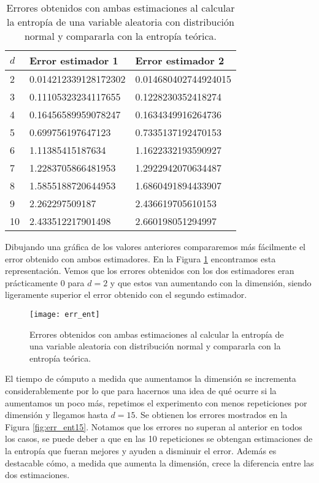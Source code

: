 \documentclass[10pt,a4paper]{article} %
\theoremstyle{definition}
\begin{document}
\begin{table}[H]
\centering
\caption{Errores obtenidos con ambas estimaciones al calcular la entropía de una variable aleatoria con distribución normal y compararla con la entropía teórica.}
\label{tab:err_ent}
\begin{tabular}{lll}
\toprule
$d$ & Error estimador 1 & Error estimador 2\\ \midrule
2 & 0.014212339128172302 & 0.014680402744924015\\
3 & 0.11105323234117655 & 0.1228230352418274\\
4 & 0.16456589959078247 & 0.1634349916264736\\
5 & 0.699756197647123 & 0.7335137192470153\\
6 & 1.11385415187634 & 1.1622332193590927\\
7 & 1.2283705866481953 & 1.2922942070634487\\
8 & 1.5855188720644953 & 1.6860491894433907\\
9 & 2.262297509187 & 2.436619705610153\\
10 & 2.433512217901498 & 2.660198051294997\\
\bottomrule
\end{tabular}
\end{table}

Dibujando una gráfica de los valores anteriores compararemos más fácilmente el error obtenido con ambos estimadores. En la Figura \ref{fig:err_ent} encontramos esta representación. Vemos que los errores obtenidos con los dos estimadores eran prácticamente 0 para $d=2$ y que estos van aumentando con la dimensión, siendo ligeramente superior el error obtenido con el segundo estimador. 

\begin{figure}[H]
    \centering
    \texttt{[image: err\_ent]}
    \caption{Errores obtenidos con ambas estimaciones al calcular la entropía de una variable aleatoria con distribución normal y compararla con la entropía teórica.}
    \label{fig:err_ent}
\end{figure}

El tiempo de cómputo a medida que aumentamos la dimensión se incrementa considerablemente por lo que para hacernos una idea de qué ocurre si la aumentamos un poco más, repetimos el experimento con menos repeticiones por dimensión y llegamos hasta $d = 15$. Se obtienen los errores mostrados en la Figura \ref{fig:err_ent15}. Notamos que los errores no superan al anterior en todos los casos, se puede deber a que en las 10 repeticiones se obtengan estimaciones de la entropía que fueran mejores y ayuden a disminuir el error. Además es destacable cómo, a medida que aumenta la dimensión, crece la diferencia entre las dos estimaciones.
\end{document}
